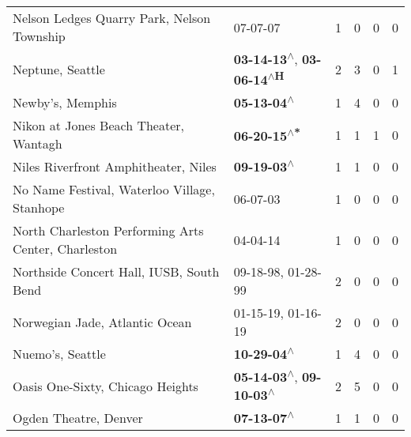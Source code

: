 \begin{supertabular}{p{0.4\textwidth}p{0.3\textwidth}p{0.05\textwidth}p{0.05\textwidth}p{0.05\textwidth}p{0.05\textwidth}}
                                   Nelson Ledges Quarry Park, Nelson Township &                                                                  07-07-07\textsuperscript{} &  1 &  0 &  0 &  0 \\
                                                             Neptune, Seattle &   \textbf{03-14-13\textsuperscript{$\wedge$}}, \textbf{03-06-14\textsuperscript{$\wedge$H}} &  2 &  3 &  0 &  1 \\
                                                             Newby's, Memphis &                                                 \textbf{05-13-04\textsuperscript{$\wedge$}} &  1 &  4 &  0 &  0 \\
                                        Nikon at Jones Beach Theater, Wantagh &                                                \textbf{06-20-15\textsuperscript{$\wedge$*}} &  1 &  1 &  1 &  0 \\
                                         Niles Riverfront Amphitheater, Niles &                                                 \textbf{09-19-03\textsuperscript{$\wedge$}} &  1 &  1 &  0 &  0 \\
                                 No Name Festival, Waterloo Village, Stanhope &                                                                  06-07-03\textsuperscript{} &  1 &  0 &  0 &  0 \\
                          North Charleston Performing Arts Center, Charleston &                                                                  04-04-14\textsuperscript{} &  1 &  0 &  0 &  0 \\
                                     Northside Concert Hall, IUSB, South Bend &                                      09-18-98\textsuperscript{}, 01-28-99\textsuperscript{} &  2 &  0 &  0 &  0 \\
                                               Norwegian Jade, Atlantic Ocean &                                      01-15-19\textsuperscript{}, 01-16-19\textsuperscript{} &  2 &  0 &  0 &  0 \\
                                                             Nuemo's, Seattle &                                                 \textbf{10-29-04\textsuperscript{$\wedge$}} &  1 &  4 &  0 &  0 \\
                                             Oasis One-Sixty, Chicago Heights &    \textbf{05-14-03\textsuperscript{$\wedge$}}, \textbf{09-10-03\textsuperscript{$\wedge$}} &  2 &  5 &  0 &  0 \\
                                                        Ogden Theatre, Denver &                                                 \textbf{07-13-07\textsuperscript{$\wedge$}} &  1 &  1 &  0 &  0 \\

\end{supertabular}
